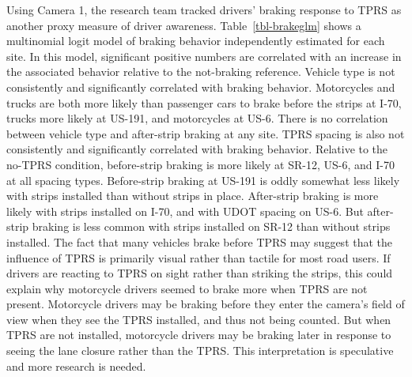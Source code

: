 \documentclass[
  letterpaper,
]{trb}
\begin{document}
Using Camera 1, the research team tracked drivers' braking response to
TPRS as another proxy measure of driver awareness.
Table~\ref{tbl-brakeglm} shows a multinomial logit model of braking
behavior independently estimated for each site. In this model,
significant positive numbers are correlated with an increase in the
associated behavior relative to the not-braking reference. Vehicle type
is not consistently and significantly correlated with braking behavior.
Motorcycles and trucks are both more likely than passenger cars to brake
before the strips at I-70, trucks more likely at US-191, and motorcycles
at US-6. There is no correlation between vehicle type and after-strip
braking at any site. TPRS spacing is also not consistently and
significantly correlated with braking behavior. Relative to the no-TPRS
condition, before-strip braking is more likely at SR-12, US-6, and I-70
at all spacing types. Before-strip braking at US-191 is oddly somewhat
less likely with strips installed than without strips in place.
After-strip braking is more likely with strips installed on I-70, and
with UDOT spacing on US-6. But after-strip braking is less common with
strips installed on SR-12 than without strips installed. The fact that
many vehicles brake before TPRS may suggest that the influence of TPRS
is primarily visual rather than tactile for most road users. If drivers
are reacting to TPRS on sight rather than striking the strips, this
could explain why motorcycle drivers seemed to brake more when TPRS are
not present. Motorcycle drivers may be braking before they enter the
camera's field of view when they see the TPRS installed, and thus not
being counted. But when TPRS are not installed, motorcycle drivers may
be braking later in response to seeing the lane closure rather than the
TPRS. This interpretation is speculative and more research is needed.
\end{document}
